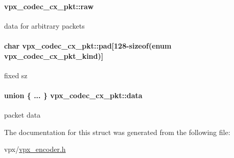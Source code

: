 \paragraph[{\texorpdfstring{raw}{raw}}]{ vpx\+\_\+codec\+\_\+cx\+\_\+pkt\+::raw}\hypertarget{structvpx__codec__cx__pkt_aaa868193733b055ea9fec923c64fbd19}{}\label{structvpx__codec__cx__pkt_aaa868193733b055ea9fec923c64fbd19}
data for arbitrary packets 
\paragraph[{\texorpdfstring{pad}{pad}}]{\setlength{\rightskip}{0pt plus 5cm}char vpx\+\_\+codec\+\_\+cx\+\_\+pkt\+::pad\mbox{[}128-\/sizeof(enum {\bf vpx\+\_\+codec\+\_\+cx\+\_\+pkt\+\_\+kind})\mbox{]}}\hypertarget{structvpx__codec__cx__pkt_a49a0ba012fdabd49bff8069dfacf6ced}{}\label{structvpx__codec__cx__pkt_a49a0ba012fdabd49bff8069dfacf6ced}
fixed sz 
\paragraph[{\texorpdfstring{data}{data}}]{\setlength{\rightskip}{0pt plus 5cm}union \{ ... \}   vpx\+\_\+codec\+\_\+cx\+\_\+pkt\+::data}\hypertarget{structvpx__codec__cx__pkt_a7f97b060a23b7e89fe5b885c0074f696}{}\label{structvpx__codec__cx__pkt_a7f97b060a23b7e89fe5b885c0074f696}
packet data 

The documentation for this struct was generated from the following file\+:\begin{DoxyCompactItemize}
\item 
vpx/\hyperlink{vpx__encoder_8h}{vpx\+\_\+encoder.\+h}\end{DoxyCompactItemize}
